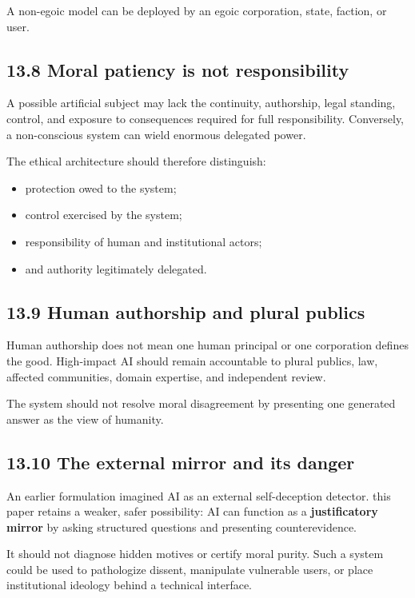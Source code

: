 \documentclass[
  11pt,
]{article}
\providecommand{\tightlist}{%
  \setlength{\itemsep}{0pt}\setlength{\parskip}{0pt}}
\begin{document}
A non-egoic model can be deployed by an egoic corporation, state,
faction, or user.

\subsection{13.8 Moral patiency is not
responsibility}\label{moral-patiency-is-not-responsibility}

A possible artificial subject may lack the continuity, authorship, legal
standing, control, and exposure to consequences required for full
responsibility. Conversely, a non-conscious system can wield enormous
delegated power.

The ethical architecture should therefore distinguish:

\begin{itemize}
\tightlist
\item
  protection owed to the system;
\item
  control exercised by the system;
\item
  responsibility of human and institutional actors;
\item
  and authority legitimately delegated.
\end{itemize}

\subsection{13.9 Human authorship and plural
publics}\label{human-authorship-and-plural-publics}

Human authorship does not mean one human principal or one corporation
defines the good. High-impact AI should remain accountable to plural
publics, law, affected communities, domain expertise, and independent
review.

The system should not resolve moral disagreement by presenting one
generated answer as the view of humanity.

\subsection{13.10 The external mirror and its
danger}\label{the-external-mirror-and-its-danger}

An earlier formulation imagined AI as an external self-deception
detector. this paper retains a weaker, safer possibility: AI can
function as a \textbf{justificatory mirror} by asking structured
questions and presenting counterevidence.

It should not diagnose hidden motives or certify moral purity. Such a
system could be used to pathologize dissent, manipulate vulnerable
users, or place institutional ideology behind a technical interface.
\end{document}
